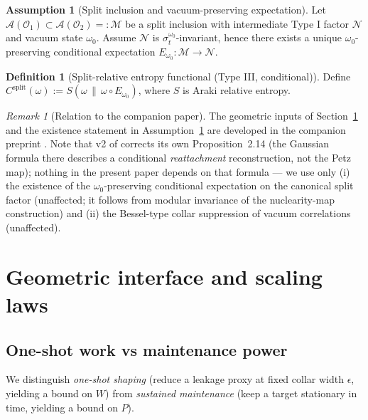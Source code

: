 \documentclass[11pt,a4paper]{article}
\theoremstyle{plain}
\theoremstyle{definition}
\newtheorem{definition}[theorem]{Definition}
\newtheorem{assumption}[theorem]{Assumption}
\theoremstyle{remark}
\newtheorem{remark}[theorem]{Remark}
\begin{document}
\begin{assumption}[Split inclusion and vacuum-preserving expectation]
\label{ass:split}
Let $\mathcal{A}(\mathcal{O}_1) \subset \mathcal{A}(\mathcal{O}_2) =:
\mathcal{M}$ be a split inclusion with intermediate Type I factor $\mathcal{N}$
and vacuum state $\omega_0$. Assume $\mathcal{N}$ is
$\sigma_t^{\omega_0}$-invariant, hence there exists a unique
$\omega_0$-preserving conditional expectation
$E_{\omega_0}: \mathcal{M} \to \mathcal{N}$.
\end{assumption}

\begin{definition}[Split-relative entropy functional (Type III, conditional)]
Define $C^{\mathrm{split}}(\omega) := S(\omega\,\|\,\omega\circ E_{\omega_0})$,
where $S$ is Araki relative entropy.
\end{definition}

\begin{remark}[Relation to the companion paper]\label{rem:companion}
The geometric inputs of Section~\ref{sec:geometry} and the existence statement
in Assumption~\ref{ass:split} are developed in the companion preprint
\cite{Companion}. Note that v2 of \cite{Companion} corrects its own
Proposition~2.14 (the Gaussian formula there describes a conditional
\emph{reattachment} reconstruction, not the Petz map); nothing in the present
paper depends on that formula --- we use only (i) the existence of the
$\omega_0$-preserving conditional expectation on the canonical split factor
(unaffected; it follows from modular invariance of the nuclearity-map
construction) and (ii) the Bessel-type collar suppression of vacuum
correlations (unaffected).
\end{remark}

\section{Geometric interface and scaling laws}\label{sec:geometry}

\subsection{One-shot work vs maintenance power}

We distinguish \emph{one-shot shaping} (reduce a leakage proxy at fixed collar
width $\epsilon$, yielding a bound on $W$) from \emph{sustained maintenance}
(keep a target stationary in time, yielding a bound on $P$).
\end{document}

